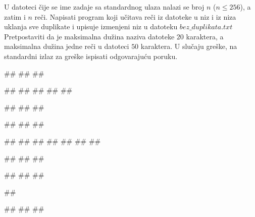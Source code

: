 \begin{Exercise}[label=p3_iv5]         
U datoteci čije se ime zadaje sa standardnog ulaza nalazi
se broj $n$ ($n\leq 256$), a zatim i $n$ reči. 
Napisati program koji učitava reči iz datoteke u niz i iz niza uklanja sve duplikate 
i upisuje izmenjeni niz u datoteku $bez\_duplikata.txt$ 
Pretpostaviti da je maksimalna dužina naziva datoteke $20$ karaktera, 
a maksimalna dužina jedne reči u datoteci $50$ karaktera.
U slučaju greške, na standardni izlaz za greške ispisati odgovarajuću poruku.

\begin{minitest}
\begin{upotreba}{1}
#\naslovInt#
##
##

##
##
##
##
##

##
##
##
\end{upotreba}
\end{minitest}
\begin{minitest}
\begin{upotreba}{2}
#\naslovInt#
##
##

##
##
##
##
##
##
##

##
##
##
\end{upotreba}
\end{minitest}
\begin{minitest}
\begin{upotreba}{3}
#\naslovInt#
##
##

##

#\naslovIzlazZaGresku#
##
##
\end{upotreba}
\end{minitest}
\end{Exercise}
\begin{Answer}[ref=p3_iv5]
\end{Answer}


